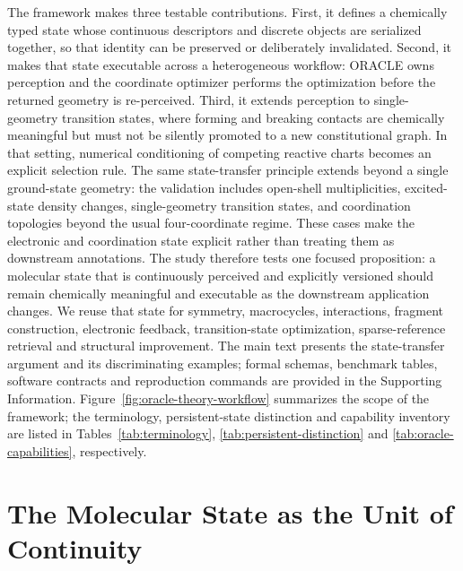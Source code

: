 \documentclass[journal=jctcce,manuscript=article]{achemso}
\begin{document}
The framework makes three testable contributions.  First, it defines a
chemically typed state whose continuous descriptors and discrete objects are
serialized together, so that identity can be preserved or deliberately
invalidated.  Second, it makes that state executable across a heterogeneous
workflow: ORACLE owns perception and the coordinate optimizer performs the
optimization before the returned geometry is re-perceived.
Third, it extends perception to single-geometry transition states, where
forming and breaking contacts are chemically meaningful but must not be
silently promoted to a new constitutional graph.  In that setting, numerical
conditioning of competing reactive charts becomes an explicit selection rule.
The same state-transfer principle extends beyond a single ground-state
geometry: the validation includes open-shell multiplicities, excited-state
density changes, single-geometry transition states, and coordination
topologies beyond the usual four-coordinate regime.  These cases make the
electronic and coordination state explicit rather than treating them as
downstream annotations.
The study therefore tests one focused proposition: a molecular state that is
continuously perceived and explicitly versioned should remain chemically
meaningful and executable as the downstream application changes.  We reuse
that state for symmetry, macrocycles, interactions, fragment construction,
electronic feedback, transition-state optimization, sparse-reference retrieval
and structural improvement.  The main text presents the state-transfer
argument and its discriminating examples; formal schemas, benchmark tables,
software contracts and reproduction commands are provided in the Supporting
Information.
Figure~\ref{fig:oracle-theory-workflow} summarizes the scope of the framework;
the terminology, persistent-state distinction and capability inventory are
listed in Tables~\ref{tab:terminology}, \ref{tab:persistent-distinction} and
\ref{tab:oracle-capabilities}, respectively.

\section{The Molecular State as the Unit of Continuity}
\end{document}
